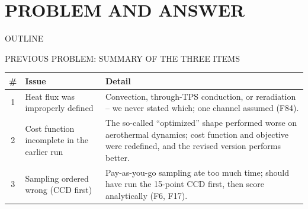 \documentclass[aspectratio=169,11pt]{beamer}
\begin{document}
{
\begin{frame}[plain]
  \ITBTitleBackground   %
  \titlepage
\end{frame}   %
}

\section{PROBLEM AND ANSWER}
\begin{frame}{OUTLINE}              %
  \footnotesize
  \tableofcontents[hideallsubsections]
\end{frame}
\begin{frame}{PREVIOUS PROBLEM: SUMMARY OF THE THREE ITEMS}   %
  \small
  \begin{tabular}{@{}c@{\,~}p{5.5cm}@{\,~}p{5.5cm}@{}}
    \textbf{\#} & \textbf{Issue} & \textbf{Detail} \\
    \hline
    1 & Heat flux was improperly defined &
    Convection, through-TPS conduction, or reradiation -- we never stated which; one channel assumed (F84). \\ \hline
    2 & Cost function incomplete in the earlier run &
    The so-called ``optimized'' shape performed worse on aerothermal dynamics; cost function and objective were redefined, and the revised version performs better. \\ \hline
    3 & Sampling ordered wrong (CCD first) &
    Pay-as-you-go sampling ate too much time; should have run the 15-point CCD first, then score analytically (F6, F17). \\
  \end{tabular}
  \vspace{0.4cm}
\end{frame}
\end{document}
